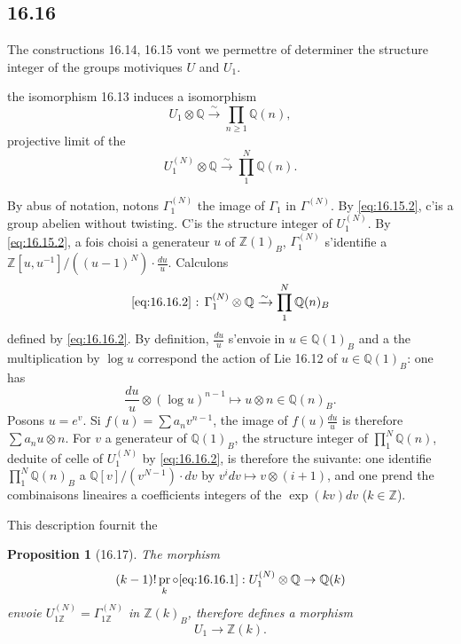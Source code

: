 \documentclass[12pt,a4paper]{article}
\theoremstyle{plain}
\newtheorem{proposition}[theorem]{Proposition}
\theoremstyle{definition}
\theoremstyle{remark}
\DeclareMathOperator{\pr}{pr}
\newcommand{\Betti}{B}
\newcommand{\ZZ}{\mathbb{Z}}
\newcommand{\QQ}{\mathbb{Q}}
\begin{document}
\subsection*{16.16}

The constructions 16.14, 16.15 vont we permettre of determiner the
structure integer of the groups motiviques $U$ and $U_1$.

the isomorphism 16.13 induces a isomorphism
\begin{equation}\label{eq:16.16.1}
U_1 \otimes \QQ \xrightarrow{\sim} \prod_{n \geq 1} \QQ(n),
\end{equation}
projective limit of the
\begin{equation}\label{eq:16.16.2}
U_1^{(N)} \otimes \QQ \xrightarrow{\sim} \prod_1^N \QQ(n).
\end{equation}

By abus of notation, notons $\Gamma_1^{(N)}$ the image of $\Gamma_1$ in
$\Gamma^{(N)}$. By \eqref{eq:16.15.2}, c'is a group abelien without
twisting. C'is the structure integer of $U_1^{(N)}$. By
\eqref{eq:16.15.2}, a fois choisi a generateur $u$ of
$\ZZ(1)_\Betti$, $\Gamma_1^{(N)}$ s'identifie a
$\ZZ[u,u^{-1}]/((u-1)^N) \cdot \frac{du}{u}$. Calculons
\begin{equation}\label{eq:16.16.3}
\text{\eqref{eq:16.16.2} : } \Gamma_1^{(N)} \otimes \QQ \xrightarrow{\sim}
\prod_1^N \QQ(n)_\Betti
\end{equation}
defined by \eqref{eq:16.16.2}. By definition, $\frac{du}{u}$ s'envoie in
$u \in \QQ(1)_\Betti$ and a the multiplication by $\log u$ correspond
the action of Lie 16.12 of $u \in \QQ(1)_\Betti$: one has
\[
\frac{du}{u} \otimes (\log u)^{n-1} \longmapsto u \otimes n \in \QQ(n)_\Betti.
\]
Posons $u = e^v$. Si $f(u) = \sum a_n v^{n-1}$, the image of
$f(u)\frac{du}{u}$ is therefore $\sum a_n u \otimes n$. For $v$ a
 generateur of $\QQ(1)_\Betti$, the structure integer of
$\prod_1^N \QQ(n)$, deduite of celle of $U_1^{(N)}$ by
\eqref{eq:16.16.2}, is therefore the suivante: one identifie
$\prod_1^N \QQ(n)_\Betti$ a $\QQ[v]/(v^{N-1}) \cdot dv$ by
$v^i dv \mapsto v \otimes (i+1)$, and one prend the combinaisons lineaires
a coefficients integers of the $\exp(kv)dv$ ($k \in \ZZ$).

This description fournit the

\begin{proposition}[16.17]\label{prop:16.17}
The morphism
\[
(k-1)! \pr_k \circ \text{\eqref{eq:16.16.1}} : U_1^{(N)} \otimes \QQ \to \QQ(k)
\]
envoie $U_{1\ZZ}^{(N)} = \Gamma_{1\ZZ}^{(N)}$ in $\ZZ(k)_\Betti$, therefore
defines a morphism
\begin{equation}\label{eq:16.17.1}
U_1 \to \ZZ(k).
\end{equation}
\end{proposition}
\end{document}
